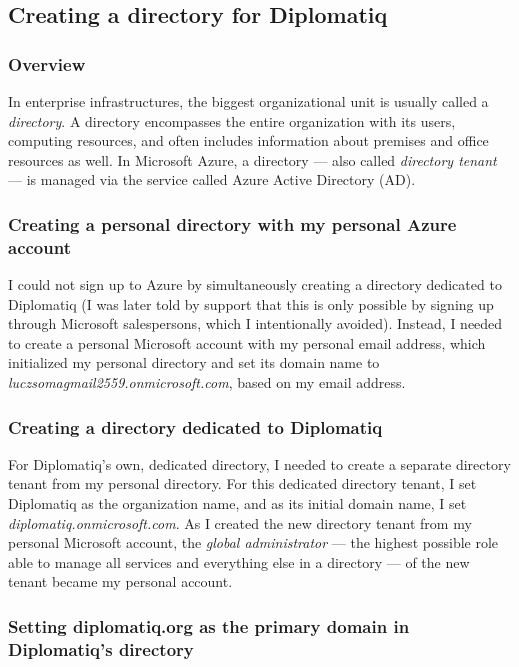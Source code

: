 \subsection{Creating a directory for Diplomatiq}

\subsubsection{Overview}

In enterprise infrastructures, the biggest organizational unit is usually called a \emph{directory}. A directory encompasses the entire organization with its users, computing resources, and often includes information about premises and office resources as well. In Microsoft Azure, a directory — also called \emph{directory tenant} — is managed via the service called Azure Active Directory (AD).

\subsubsection{Creating a personal directory with my personal Azure account}

I could not sign up to Azure by simultaneously creating a directory dedicated to Diplomatiq (I was later told by support that this is only possible by signing up through Microsoft salespersons, which I intentionally avoided). Instead, I needed to create a personal Microsoft account with my personal email address, which initialized my personal directory and set its domain name to \emph{luczsomagmail2559.onmicrosoft.com}, based on my email address.

\subsubsection{Creating a directory dedicated to Diplomatiq}

For Diplomatiq's own, dedicated directory, I needed to create a separate directory tenant from my personal directory. For this dedicated directory tenant, I set Diplomatiq as the organization name, and as its initial domain name, I set \emph{diplomatiq.onmicrosoft.com}. As I created the new directory tenant from my personal Microsoft account, the \emph{global administrator} — the highest possible role able to manage all services and everything else in a directory — of the new tenant became my personal account.

\subsubsection{Setting diplomatiq.org as the primary domain in Diplomatiq's directory}

